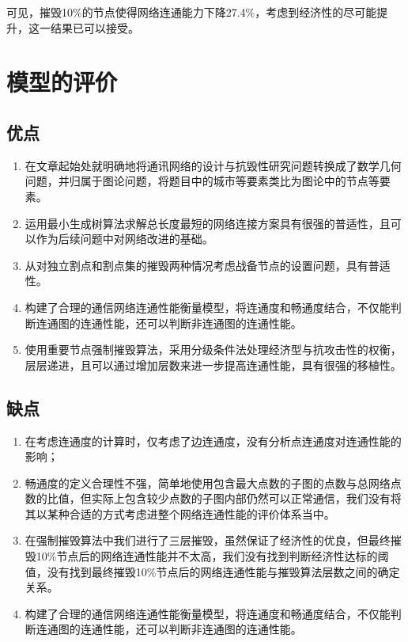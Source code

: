 \documentclass{article}
\begin{document}
可见，摧毁10\%的节点使得网络连通能力下降27.4\%，考虑到经济性的尽可能提升，这一结果已可以接受。

\section{模型的评价}%
\label{sec:模型的评价}

\subsection{优点}%
\label{sub:优点}

\begin{enumerate}
	\item 在文章起始处就明确地将通讯网络的设计与抗毁性研究问题转换成了数学几何问题，并归属于图论问题，将题目中的城市等要素类比为图论中的节点等要素。
	\item 运用最小生成树算法求解总长度最短的网络连接方案具有很强的普适性，且可以作为后续问题中对网络改进的基础。
	\item 从对独立割点和割点集的摧毁两种情况考虑战备节点的设置问题，具有普适性。
	\item 构建了合理的通信网络连通性能衡量模型，将连通度和畅通度结合，不仅能判断连通图的连通性能，还可以判断非连通图的连通性能。
	\item 使用重要节点强制摧毁算法，采用分级条件法处理经济型与抗攻击性的权衡，层层递进，且可以通过增加层数来进一步提高连通性能，具有很强的移植性。
\end{enumerate}

\subsection{缺点}%
\label{sub:缺点}

\begin{enumerate}
	\item 在考虑连通度的计算时，仅考虑了边连通度，没有分析点连通度对连通性能的影响；
	\item 畅通度的定义合理性不强，简单地使用包含最大点数的子图的点数与总网络点数的比值，但实际上包含较少点数的子图内部仍然可以正常通信，我们没有将其以某种合适的方式考虑进整个网络连通性能的评价体系当中。
	\item 在强制摧毁算法中我们进行了三层摧毁，虽然保证了经济性的优良，但最终摧毁10\%节点后的网络连通性能并不太高，我们没有找到判断经济性达标的阈值，没有找到最终摧毁10\%节点后的网络连通性能与摧毁算法层数之间的确定关系。
	\item 构建了合理的通信网络连通性能衡量模型，将连通度和畅通度结合，不仅能判断连通图的连通性能，还可以判断非连通图的连通性能。
\end{enumerate}
\end{document}
